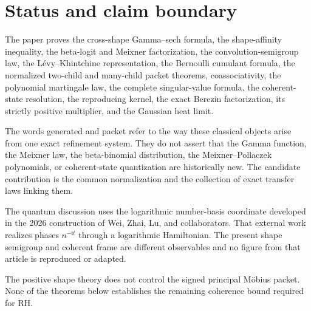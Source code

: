 \documentclass[11pt,openany]{report}
\theoremstyle{definition}
\theoremstyle{remark}
\newcommand{\ii}{\mathrm i}
\begin{document}
\begin{abstract}
The classical ingredients include log-Gamma laws, Meixner distributions, Meixner--Pollaczek polynomials, coherent states, and Berezin quantization. The generated contribution is the exact packet system joining cross-shape ambiguity, shape convolution, beta-binomial refinement, polynomial transfer, coherent frames, and the Gaussian fixed point in one calculus. The paper does not prove the signed M\"obius coherence estimate and does not prove the Riemann hypothesis.

All figures were generated by the accompanying Python program. The release contains 28 vector figures, matching PNG files, exact tables, 24 built-in checks, independent tests, and the complete Python source.
\end{abstract}

\chapter*{Status and claim boundary}
The paper proves the cross-shape Gamma--sech formula, the shape-affinity inequality, the beta-logit and Meixner factorization, the convolution-semigroup law, the L\'evy--Khintchine representation, the Bernoulli cumulant formula, the normalized two-child and many-child packet theorems, coassociativity, the polynomial martingale law, the complete singular-value formula, the coherent-state resolution, the reproducing kernel, the exact Berezin factorization, its strictly positive multiplier, and the Gaussian heat limit.

The words generated and packet refer to the way these classical objects arise from one exact refinement system. They do not assert that the Gamma function, the Meixner law, the beta-binomial distribution, the Meixner--Pollaczek polynomials, or coherent-state quantization are historically new. The candidate contribution is the common normalization and the collection of exact transfer laws linking them.

The quantum discussion uses the logarithmic number-basis coordinate developed in the 2026 construction of Wei, Zhai, Lu, and collaborators. That external work realizes phases \(n^{-\ii t}\) through a logarithmic Hamiltonian. The present shape semigroup and coherent frame are different observables and no figure from that article is reproduced or adapted.

The positive shape theory does not control the signed principal M\"obius packet. None of the theorems below establishes the remaining coherence bound required for RH.
\end{document}
